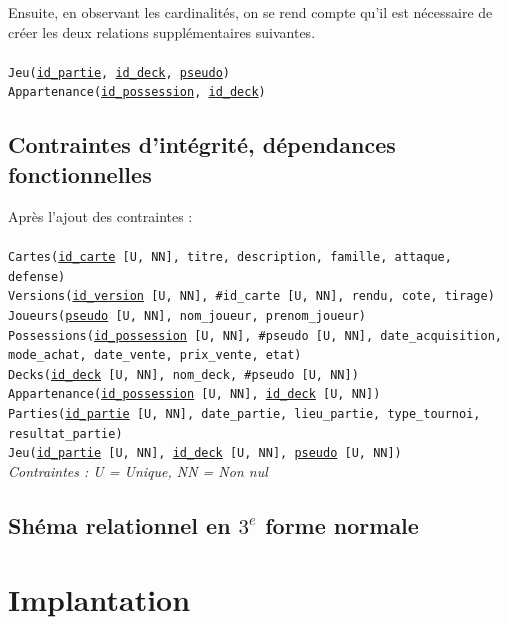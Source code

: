\documentclass[a4paper,10.5pt]{article}
\begin{document}
Ensuite, en observant les cardinalités, on se rend compte qu'il est nécessaire de créer les deux relations supplémentaires suivantes. \\
\\
\texttt{Jeu(\underline{id\_partie}, \underline{id\_deck}, \underline{pseudo})} \\
\texttt{Appartenance(\underline{id\_possession}, \underline{id\_deck})} \\

\subsection{Contraintes d'intégrité, dépendances fonctionnelles}
Après l'ajout des contraintes : \\
\\
\texttt{Cartes(\underline{id\_carte} [U, NN], titre, description, famille, attaque, defense)} \\
\texttt{Versions(\underline{id\_version} [U, NN], \#id\_carte [U, NN], rendu, cote, tirage)} \\
\texttt{Joueurs(\underline{pseudo} [U, NN], nom\_joueur, prenom\_joueur)} \\
\texttt{Possessions(\underline{id\_possession} [U, NN], \#pseudo [U, NN], date\_acquisition, mode\_achat, date\_vente, prix\_vente, etat)} \\
\texttt{Decks(\underline{id\_deck} [U, NN], nom\_deck, \#pseudo [U, NN])} \\
\texttt{Appartenance(\underline{id\_possession} [U, NN], \underline{id\_deck} [U, NN])} \\
\texttt{Parties(\underline{id\_partie} [U, NN], date\_partie, lieu\_partie, type\_tournoi, resultat\_partie)} \\
\texttt{Jeu(\underline{id\_partie} [U, NN], \underline{id\_deck} [U, NN], \underline{pseudo} [U, NN])} \\

\textit{Contraintes : U = Unique, NN = Non nul}

\subsection{Shéma relationnel en $3^e$ forme normale}

\section{Implantation}
\end{document}
